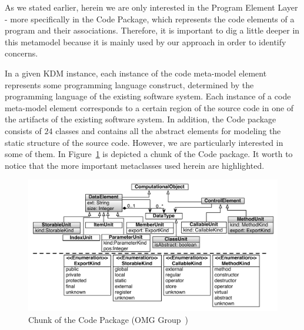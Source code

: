 As we stated earlier, herein we are only interested in the Program Element Layer - more specifically  in the Code Package, which represents the code elements of a program and their associations. Therefore, it is important to dig a little deeper in this metamodel because it is mainly used by our approach in order to identify concerns. 

In a given KDM instance, each instance of the code meta-model element represents some programming language construct, determined by the programming language of the existing software system. Each instance of a code meta-model element corresponds to a certain region of the source code in one of the artifacts of the existing software system. In addition, the Code package consists of $24$ classes  and contains all the abstract elements for modeling the static structure of the source code. However, we are particularly interested in some of them. In Figure~\ref{fig:programLayer} is depicted a chunk of the Code package. It worth to notice that the more important metaclasses used herein are highlighted.

\begin{figure}[!ht]
\centering
  \includegraphics[scale=0.42]{figuras/ProgramLayer}
\caption{Chunk of the Code Package (OMG Group~\cite{OMGADM})}
\label{fig:programLayer}
\end{figure}

